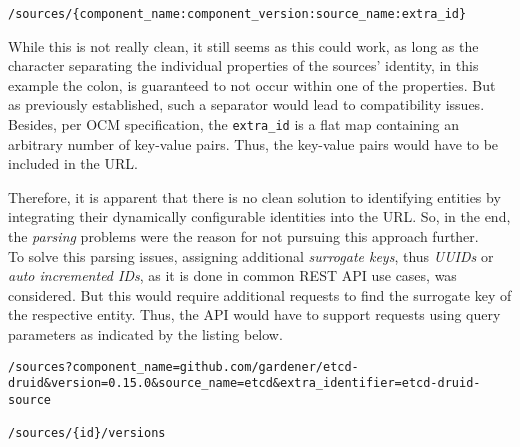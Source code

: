 \begin{lstlisting}[caption=REST API Source Endpoint, captionpos=b, label=lst:RESTAPISourceEndpoint]
/sources/{component_name:component_version:source_name:extra_id}
\end{lstlisting}

While this is not really clean, it still seems as this could work, as long as the character separating the individual properties of the sources' identity, in this example the colon, is guaranteed to not occur within one of the properties. But as previously established, such a separator would lead to compatibility issues. Besides, per OCM specification, the \lstinline|extra_id| is a flat map containing an arbitrary number of key-value pairs. Thus, the key-value pairs would have to be included in the URL.\par
Therefore, it is apparent that there is no clean solution to identifying entities by integrating their dynamically configurable identities into the URL. So, in the end, the \emph{parsing} problems were the reason for not pursuing this approach further.\\

To solve this parsing issues, assigning additional \emph{surrogate keys}, thus \emph{UUIDs} or \emph{auto incremented IDs}, as it is done in common REST API use cases, was considered. But this would require additional requests to find the surrogate key of the respective entity. Thus, the API would have to support requests using query parameters as indicated by the listing below.\\

\begin{lstlisting}[caption=Querying for Entitiy ID, captionpos=b, label=lst:QueryingForEntityID]
/sources?component_name=github.com/gardener/etcd-druid&version=0.15.0&source_name=etcd&extra_identifier=etcd-druid-source

/sources/{id}/versions
\end{lstlisting}

